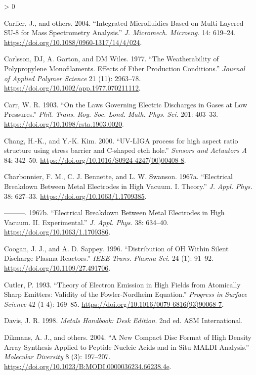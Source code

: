 \documentclass[
  10pt,
  twoside]{article}
\newlength{\cslhangindent}
\newenvironment{CSLReferences}[2] %
 {%
  \setlength{\parindent}{0pt}
  \ifodd #1 \everypar{\setlength{\hangindent}{\cslhangindent}}\ignorespaces\fi
  \ifnum #2 > 0
  \setlength{\parskip}{#2\baselineskip}
  \fi
 }%
 {}
\begin{document}
\begin{CSLReferences}{1}{0}
\leavevmode\hypertarget{ref-Carl04}{}%
Carlier, J., and others. 2004. {``Integrated Microfluidics Based on Multi-Layered SU-8 for Mass Spectrometry Analysis.''} \emph{J. Micromech. Microeng.} 14: 619--24. \url{https://doi.org/10.1088/0960-1317/14/4/024}.

\leavevmode\hypertarget{ref-Carl1977}{}%
Carlsson, DJ, A. Garton, and DM Wiles. 1977. {``The Weatherability of Polypropylene Monofilaments. Effects of Fiber Production Conditions.''} \emph{Journal of Applied Polymer Science} 21 (11): 2963--78. \url{https://doi.org/10.1002/app.1977.070211112}.

\leavevmode\hypertarget{ref-Carr1903}{}%
Carr, W. R. 1903. {``On the Laws Governing Electric Discharges in Gases at Low Pressures.''} \emph{Phil. Trans. Roy. Soc. Lond. Math. Phys. Sci.} 201: 403--33. \url{https://doi.org/10.1098/rsta.1903.0020}.

\leavevmode\hypertarget{ref-Chang00}{}%
Chang, H.-K., and Y.-K. Kim. 2000. {``{UV-LIGA process for high aspect ratio structure using stress barrier and C-shaped etch hole}.''} \emph{Sensors and Actuators A} 84: 342--50. \url{https://doi.org/10.1016/S0924-4247(00)00408-8}.

\leavevmode\hypertarget{ref-Char1967}{}%
Charbonnier, F. M., C. J. Bennette, and L. W. Swanson. 1967a. {``Electrical Breakdown Between Metal Electrodes in High Vacuum. I. Theory.''} \emph{J. Appl. Phys.} 38: 627--33. \url{https://doi.org/10.1063/1.1709385}.

\leavevmode\hypertarget{ref-Char1967-2}{}%
---------. 1967b. {``Electrical Breakdown Between Metal Electrodes in High Vacuum. II. Experimental.''} \emph{J. Appl. Phys.} 38: 634--40. \url{https://doi.org/10.1063/1.1709386}.

\leavevmode\hypertarget{ref-Coog1996}{}%
Coogan, J. J., and A. D. Sappey. 1996. {``Distribution of {OH} Within Silent Discharge Plasma Reactors.''} \emph{IEEE Trans. Plasma Sci.} 24 (1): 91--92. \url{https://doi.org/10.1109/27.491706}.

\leavevmode\hypertarget{ref-Cutl1993}{}%
Cutler, P. 1993. {``Theory of Electron Emission in High Fields from Atomically Sharp Emitters: Validity of the Fowler-Nordheim Equation.''} \emph{Progress in Surface Science} 42 (1-4): 169--85. \url{https://doi.org/10.1016/0079-6816(93)90068-7}.

\leavevmode\hypertarget{ref-Davi1998}{}%
Davis, J. R. 1998. \emph{Metals Handbook: Desk Edition}. 2nd ed. ASM International.

\leavevmode\hypertarget{ref-Dikm04}{}%
Dikmans, A. J., and others. 2004. {``A New Compact Disc Format of High Density Array Synthesis Applied to Peptide Nucleic Acids and in Situ {MALDI} Analysis.''} \emph{Molecular Diversity} 8 (3): 197--207. \url{https://doi.org/10.1023/B:MODI.0000036234.66238.4e}.


\end{CSLReferences}
\end{document}
